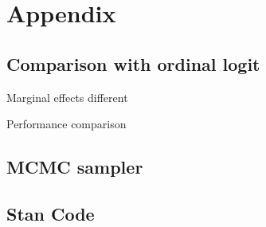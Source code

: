 \renewcommand{\thefigure}{A\arabic{figure}}
\setcounter{figure}{0}
\renewcommand{\thetable}{A.\arabic{table}}
\setcounter{table}{0}
\renewcommand{\thesection}{A.\arabic{section}}
\setcounter{section}{0}

\section*{Appendix}

\subsection*{Comparison with ordinal logit}

Marginal effects different

Performance comparison

\subsection*{MCMC sampler}


\subsection*{Stan Code}



